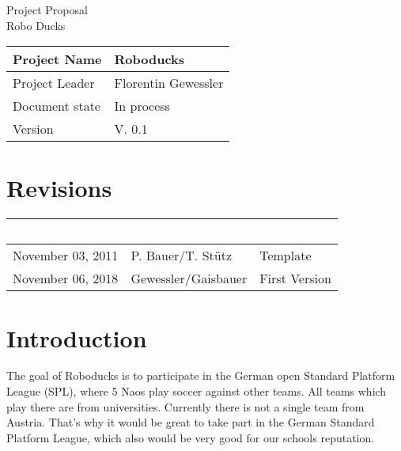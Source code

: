 \documentclass[12pt]{article}
\theoremstyle{definition}
\newcommand{\projectname}{Roboducks}
\newcommand{\productname}{Robo Ducks}
\newcommand{\projectleader}{Florentin Gewessler}
\newcommand{\documentstatus}{In process}
\newcommand{\version}{V. 0.1}
\begin{document}
\begin{titlepage}
\begin{flushright}

\end{flushright}

\vspace{10em}

\begin{center}
{\Huge Project Proposal} \\[3em]
{\LARGE \productname} \\[3em]
\end{center}

\begin{flushleft}
\begin{tabular}{|l|l|}
\hline
Project Name & \projectname \\ \hline
Project Leader & \projectleader \\ \hline
Document state & \documentstatus \\ \hline
Version & \version \\ \hline
\end{tabular}
\end{flushleft}

\end{titlepage}
\section*{Revisions}
\begin{tabular}{|l|l|l|}
\hline
\cellcolor[gray]{0.5}\textcolor{white}{Date} & \cellcolor[gray]{0.5}\textcolor{white}{Author} & \cellcolor[gray]{0.5}\textcolor{white}{Change} \\ \hline
November 03, 2011&P. Bauer/T. Stütz&Template \\ \hline
November 06, 2018&Gewessler/Gaisbauer&First Version\\ \hline
\end{tabular}
\pagebreak

\tableofcontents
\pagebreak

\section{Introduction}

The goal of Roboducks is to participate in the German open Standard Platform League (SPL), where 5 Naos play soccer against other teams. All teams which play there are from universities. Currently there is not a single team from Austria. That's why it would be great to take part in the German Standard Platform League, which also would be very good for our schools reputation.\\
\end{document}
